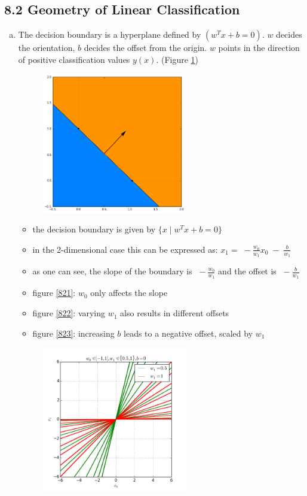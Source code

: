 \documentclass[10pt,a4paper]{article}
\begin{document}
\subsection*{8.2 Geometry of Linear Classification}
\begin{enumerate}[a)]
\item
The decision boundary is a hyperplane defined by $(w^Tx + b = 0)$. $w$ decides the orientation,
$b$ decides the offset from the origin. $w$ points in the direction of positive classification values $y(x)$. (Figure \ref{820})
\begin{figure}[h]
	\centering
	\includegraphics[width=0.6\textwidth]{820.png}
    \caption{}
	\label{820}
\end{figure}
\begin{itemize}
\item the decision boundary is given by $\{x\;|\;w^Tx + b=0\}$
\item in the 2-dimensional case this can be expressed as: $x_1 = \;-\frac{w_0}{w_1}x_0 \;-\; \frac{b}{w_1}$
\item as one can see, the slope of the boundary is $\;-\frac{w_0}{w_1}$ and the offset is $\;-\frac{b}{w_1}$
    \item figure \ref{821}: $w_0$ only affects the slope
    \item figure \ref{822}: varying $w_1$ also results in different offsets
    \item figure \ref{823}: increasing $b$ leads to a negative offset, scaled by $w_1$
\end{itemize}
\begin{figure}[h]
	\centering
	\includegraphics[width=0.6\textwidth]{821.png}

\end{figure}
\end{enumerate}
\end{document}
